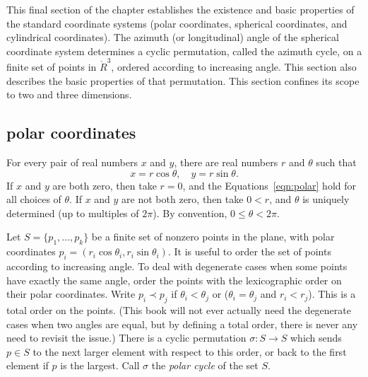 This final section of the chapter establishes the existence
and basic properties of the standard coordinate systems
(polar coordinates, spherical coordinates, and cylindrical
coordinates).  The azimuth (or longitudinal) angle of the
spherical coordinate system determines a cyclic permutation,
called the azimuth cycle,
on a finite set of points in $\ring{R}^3$, ordered according
to increasing angle.  This section also describes the basic
properties of that permutation.  This section confines its
scope to two and three dimensions.

\subsection{polar coordinates}
\label{sec:polar}


For every pair of real numbers $x$ and $y$,  there are real numbers
$r$ and $\theta$ such that
    \begin{equation}\label{eqn:polar}
    x = r\cos\theta,\quad y = r\sin\theta.
    \end{equation}
If $x$ and $y$ are both zero, then take $r=0$, and the
Equations~\ref{eqn:polar} hold for all choices of $\theta$. If $x$
and $y$ are not both zero, then take $0<r$, and $\theta$ is
uniquely determined (up to multiples of $2\pi$).  By convention, 
$0\le\theta < 2\pi$.

Let $S=\{p_1,\ldots,p_k\}$ be a finite set of
nonzero points in the plane, with
polar coordinates $p_i = (r_i\cos\theta_i,r_i\sin\theta_i)$.
It is useful to order the set of points according to increasing angle.
To deal with degenerate cases when some points have exactly
the same angle, order the points with the lexicographic order on their
polar coordinates.  Write $p_i \prec p_j$ if
$\theta_i < \theta_j$ or ($\theta_i=\theta_j$ and $r_i<r_j$).
This is a total order on the points.  (This book will not ever
actually need the degenerate cases when two angles are equal,
but by defining a total order,  there is never any need to revisit the issue.)
There is a cyclic permutation $\sigma:S\to S$ which sends
$p\in S$ to the next larger element with respect to this order,
or back to the first element if $p$ is the largest.
Call $\sigma$ the {\it polar cycle}
of the set $S$.




